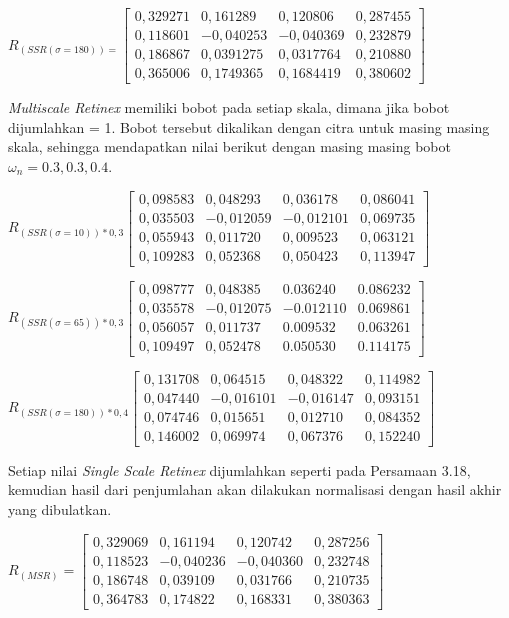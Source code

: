 \noindent
$R_{(SSR(\sigma=180))=}\left[
\begin{matrix}
0,329271&	0,161289&	0,120806&	0,287455\\
0,118601&	-0,040253&	-0,040369&	0,232879\\
0,186867&	0,0391275&	0,0317764&	0,210880\\
0,365006&	0,1749365&	0,1684419&	0,380602
\end{matrix}
\right]$

\noindent \emph{Multiscale Retinex} memiliki bobot pada setiap skala, dimana jika bobot dijumlahkan = 1. Bobot tersebut dikalikan dengan citra untuk masing masing skala, sehingga mendapatkan nilai berikut dengan masing masing bobot$\omega_n=0.3, 0.3, 0.4$.

\noindent
$R_{(SSR(\sigma=10))*0,3}\left[
\begin{matrix}
0,098583&	0,048293&	0,036178&	0,086041\\
0,035503&	-0,012059&	-0,012101&	0,069735\\
0,055943&	0,011720&	0,009523&	0,063121\\
0,109283&	0,052368&	0,050423&	0,113947
\end{matrix}
\right]$

\noindent
$R_{(SSR(\sigma=65))*0,3}\left[
\begin{matrix}
0,098777&	0,048385&	0.036240&	0.086232\\
0,035578&	-0,012075&	-0.012110&	0.069861\\
0,056057&	0,011737&	0.009532&	0.063261\\
0,109497&	0,052478&	0.050530&	0.114175
\end{matrix}
\right]$

\noindent
$R_{(SSR(\sigma=180))*0,4}\left[
\begin{matrix}
0,131708&	0,064515&	0,048322&	0,114982\\
0,047440&	-0,016101&	-0,016147&	0,093151\\
0,074746&	0,015651&	0,012710&	0,084352\\
0,146002&	0,069974&	0,067376&	0,152240
\end{matrix}
\right]$

\noindent Setiap nilai \emph{Single Scale Retinex} dijumlahkan seperti pada Persamaan 3.18, kemudian hasil dari penjumlahan akan dilakukan normalisasi dengan hasil akhir yang dibulatkan.

\noindent
$R_{(MSR)}=\left[
\begin{matrix}
0,329069&	0,161194&	0,120742&	0,287256\\
0,118523&	-0,040236&	-0,040360&	0,232748\\
0,186748&	0,039109&	0,031766&	0,210735\\
0,364783&	0,174822&	0,168331&	0,380363
\end{matrix}
\right]$


